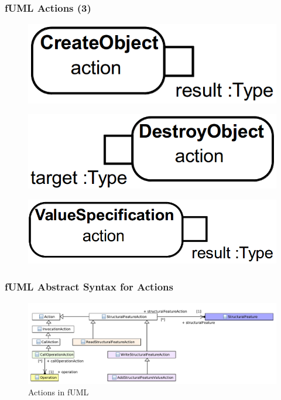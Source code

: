 \documentclass{beamer}
\begin{document}
\begin{frame}
 \frametitle{fUML Actions (3)}
\begin{figure}[h!t]
 \centering
 \includegraphics[scale=0.18]{images/fuml-actions/CreateObject.png}
\end{figure}
\begin{figure}[h!t]
 \centering
 \includegraphics[scale=0.18]{images/fuml-actions/DestroyObject.png}
\end{figure}
\begin{figure}[h!t]
 \centering
 \includegraphics[scale=0.18]{images/fuml-actions/ValueSpecification.png}
\end{figure}
\end{frame}

\begin{frame}
\frametitle{fUML Abstract Syntax for Actions}
\begin{figure}[h!t]
 \centering
 \includegraphics[scale=0.5]{images/Model_Model_Behavior_pres}
 \caption{Actions in fUML}
 \label{fig:behavior}
\end{figure}
\end{frame}
\end{document}
